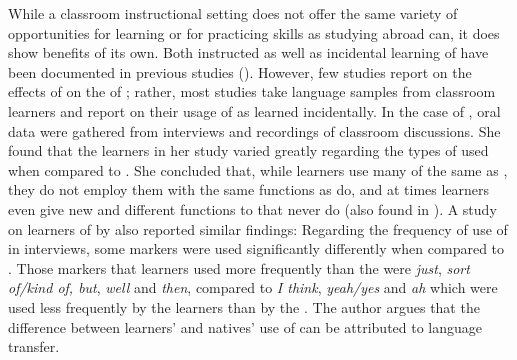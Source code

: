 \documentclass[output=paper]{langsci/langscibook}
\begin{document}
While a classroom instructional setting does not offer the same variety of opportunities for learning or for practicing  skills as studying abroad can, it does show benefits of its own. Both instructed as well as incidental learning of  have been documented in previous studies (\citealt{NguyenEtAl2012,Bardovi-Harlig2015}). However, few studies report on the effects of  on the  of ; rather, most studies take language samples from classroom learners and report on their usage of  as learned incidentally. In the case of \citet{Bu2013}, oral data were gathered from interviews and recordings of  classroom discussions. She found that the  learners in her study varied greatly regarding the types of  used when compared to . She concluded that, while learners use many of the same  as  , they do not employ them with the same functions as  do, and at times learners even give new and different functions to  that  never do (also found in \citealt{Müller2005}). A study on  learners of  by \citet{Liu2013} also reported similar findings: Regarding the frequency of use of  in interviews, some markers were used significantly differently when compared to . Those markers that learners used more frequently than the  were \textit{just}, \textit{sort of/kind of, but}, \textit{well} and \textit{then}, compared to \textit{I think}, \textit{yeah/yes} and \textit{ah} which were used less frequently by the learners than by the . The author argues that the difference between learners’ and natives’ use of  can be attributed to language transfer. 
\end{document}
